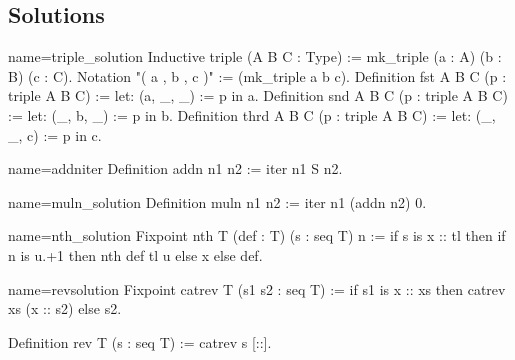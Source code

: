 \subsection{Solutions}


\begin{Answer}[ref=ex:triple]

\begin{coq}{name=triple_solution}{}
Inductive triple (A B C : Type) := mk_triple (a : A) (b : B) (c : C).
Notation "( a , b , c )" := (mk_triple a b c).
Definition fst  A B C (p : triple A B C) := let: (a, _, _) := p in a.
Definition snd  A B C (p : triple A B C) := let: (_, b, _) := p in b.
Definition thrd A B C (p : triple A B C) := let: (_, _, c) := p in c.
\end{coq}

\end{Answer}

\begin{Answer}[ref=ex:iteradd]

\begin{coq}{name=addniter}{}
Definition addn n1 n2 := iter n1 S n2.
\end{coq}

\end{Answer}

\begin{Answer}[ref=ex:itermul]

\begin{coq}{name=muln_solution}{}
Definition muln n1 n2 := iter n1 (addn n2) 0.
\end{coq}

\end{Answer}

\begin{Answer}[ref=ex:nth]

\begin{coq}{name=nth_solution}{}
Fixpoint nth T (def : T) (s : seq T) n :=
  if s is x :: tl then if n is u.+1 then nth def tl u else x else def.
\end{coq}

\end{Answer}

\begin{Answer}[ref=ex:rev]

\begin{coq}{name=revsolution}{}
Fixpoint catrev T (s1 s2 : seq T) :=
  if s1 is x :: xs then catrev xs (x :: s2) else s2.

Definition rev T (s : seq T) := catrev s [::].
\end{coq}

\end{Answer}

